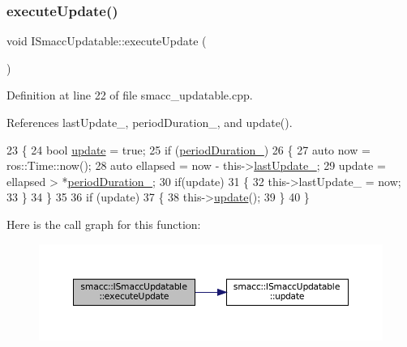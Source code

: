 \subsubsection{\texorpdfstring{execute\+Update()}{executeUpdate()}}
{\footnotesize\ttfamily void I\+Smacc\+Updatable\+::execute\+Update (\begin{DoxyParamCaption}{ }\end{DoxyParamCaption})}



Definition at line 22 of file smacc\+\_\+updatable.\+cpp.



References last\+Update\+\_\+, period\+Duration\+\_\+, and update().


\begin{DoxyCode}
23 \{
24     \textcolor{keywordtype}{bool} \hyperlink{classsmacc_1_1ISmaccUpdatable_a84ee0520cbefdb1d412bed54650b028e}{update} = \textcolor{keyword}{true};
25     \textcolor{keywordflow}{if} (\hyperlink{classsmacc_1_1ISmaccUpdatable_ad02d9798ac5609f3ecb9fb8a46febc18}{periodDuration\_})
26     \{
27         \textcolor{keyword}{auto} now = ros::Time::now();
28         \textcolor{keyword}{auto} ellapsed = now - this->\hyperlink{classsmacc_1_1ISmaccUpdatable_ad58f7e1cd26d3fe8c3a3fccecc57feac}{lastUpdate\_};
29         update = ellapsed > *\hyperlink{classsmacc_1_1ISmaccUpdatable_ad02d9798ac5609f3ecb9fb8a46febc18}{periodDuration\_};
30         \textcolor{keywordflow}{if}(update)
31         \{
32             this->lastUpdate\_ = now;
33         \}
34     \}
35 
36     \textcolor{keywordflow}{if} (update)
37     \{
38         this->\hyperlink{classsmacc_1_1ISmaccUpdatable_a84ee0520cbefdb1d412bed54650b028e}{update}();
39     \}
40 \}
\end{DoxyCode}
Here is the call graph for this function\+:
\nopagebreak
\begin{figure}[H]
\begin{center}
\leavevmode
\includegraphics[width=350pt]{classsmacc_1_1ISmaccUpdatable_af6edbb3896745920ed82fd807358fa47_cgraph}
\end{center}
\end{figure}
\mbox{\label{classsmacc_1_1ISmaccUpdatable_a88f3b092a81b2d8810a9776c8c69855b}} 
